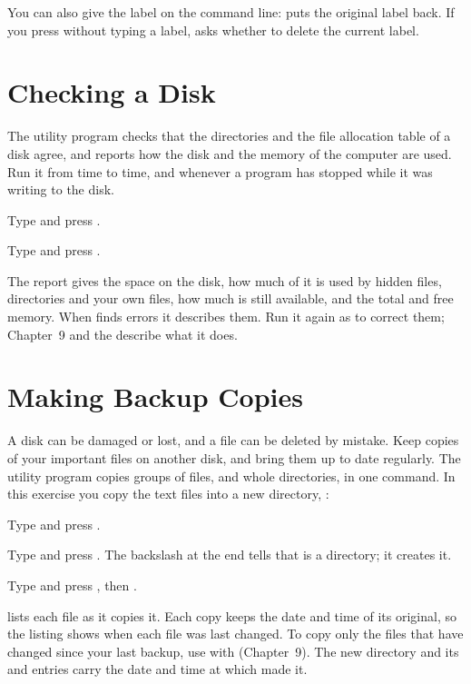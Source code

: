 
You can also give the label on the command line:  puts
the original label back.  If you press  without typing a label,
 asks whether to delete the current label.

\section{Checking a Disk}
The  utility program checks that the directories and the file
allocation table of a disk agree, and reports how the disk and the memory of
the computer are used.  Run it from time to time, and whenever a program
has stopped while it was writing to the disk.
\begin{Steps}
\item Type  and press .
\item Type  and press .
\end{Steps}


The report gives the space on the disk, how much of it is used by hidden
files, directories and your own files, how much is still available, and the
total and free memory.  When  finds errors it describes them.
Run it again as  to correct them; Chapter~9 and the
 describe what it does.

\section{Making Backup Copies}
A disk can be damaged or lost, and a file can be deleted by mistake.  Keep
copies of your important files on another disk, and bring them up to date
regularly.  The  utility program copies groups of files, and
whole directories, in one command.  In this exercise you copy the text files
into a new directory, :
\begin{Steps}
\item Type  and press .
\item Type  and press .  The
  backslash at the end tells  that  is a directory;
  it creates it.
\item Type  and press , then .
\end{Steps}


 lists each file as it copies it.  Each copy keeps the date and
time of its original, so the listing shows when each file was last
changed.  To copy only the files that have changed since your last backup,
use  with  (Chapter~9).  The new directory
 and its  and  entries carry the date and time
at which  made it.
